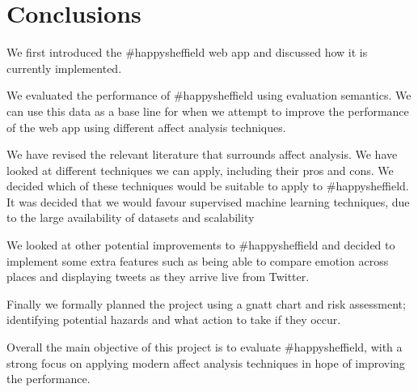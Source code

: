 \chapter{Conclusions}

We first introduced the \#happysheffield web app and discussed how it is currently implemented.

We evaluated the performance of \#happysheffield using evaluation semantics. We can use this data as a base line for when we attempt to improve the performance of the web app using different affect analysis techniques.

We have revised the relevant literature that surrounds affect analysis. We have looked at different techniques we can apply, including their pros and cons. We decided which of these techniques would be suitable to apply to \#happysheffield. It was decided that we would favour supervised machine learning techniques, due to the large availability of datasets and scalability 

We looked at other potential improvements to \#happysheffield and decided to implement some extra features such as being able to compare emotion across places and displaying tweets as they arrive live from Twitter.

Finally we formally planned the project using a gnatt chart and risk assessment; identifying potential hazards and what action to take if they occur.

Overall the main objective of this project is to evaluate \#happysheffield, with a strong focus on applying modern affect analysis techniques in hope of improving the performance.




